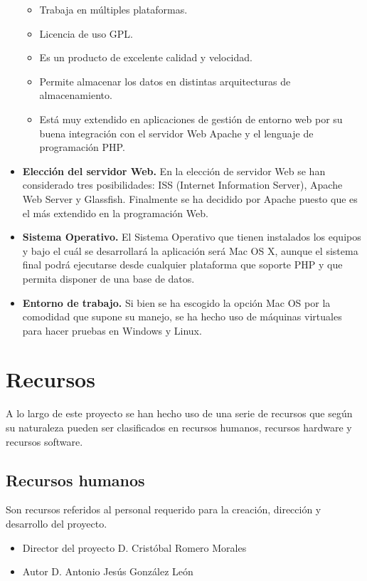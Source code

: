 \begin{itemize}
\begin{itemize}
		\item Trabaja en múltiples plataformas.
		\item Licencia de uso GPL.
		\item Es un producto de excelente calidad y velocidad.
		\item Permite almacenar los datos en distintas arquitecturas de almacenamiento.
		\item Está muy extendido en aplicaciones de gestión de entorno web por su buena integración con el servidor Web Apache y el lenguaje de programación PHP.
		\end{itemize}	
	\item \textbf{Elección del servidor Web.} En la elección de servidor Web se han considerado tres posibilidades: ISS (Internet Information Server), Apache Web Server y Glassfish. Finalmente se ha decidido por Apache puesto que es el más extendido en la programación Web.	
	\item \textbf{Sistema Operativo.} El Sistema Operativo que tienen instalados los equipos y bajo el cuál se desarrollará la aplicación será Mac OS X, aunque el sistema final podrá ejecutarse desde cualquier plataforma que soporte PHP y que permita disponer de una base de datos.
	\item \textbf{Entorno de trabajo.} Si bien se ha escogido la opción Mac OS por la comodidad que supone su manejo, se ha hecho uso de máquinas virtuales para hacer pruebas en Windows y Linux.
\end{itemize}

\section{Recursos}

A lo largo de este proyecto se han hecho uso de una serie de recursos que según su naturaleza pueden ser clasificados en recursos humanos, recursos hardware y recursos software.

\subsection{Recursos humanos}

Son recursos referidos al personal requerido para la creación, dirección y desarrollo del proyecto.

\begin{itemize}
	\item Director del proyecto D. Cristóbal Romero Morales
	\item Autor D. Antonio Jesús González León
\end{itemize}


